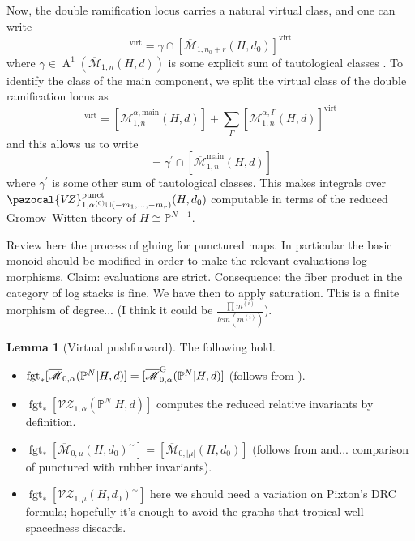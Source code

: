\documentclass[11pt]{amsart}
\newcommand{\M}[4]{\overline{\mathcal{M}}_{#1,#2}(#3,#4)}
\newcommand{\MG}[4]{\overline{\mathcal{M}}^{\rm G}_{#1,#2}(#3,#4)}
\newcommand{\PP}{\mathbb P}
\newcommand{\VZ}{\pazocal{V\!Z}}
\newcommand{\VZc}[4]{\mathcal{V\!Z}_{#1,#2}(#3,#4)}
\newcommand{\virt}[1]{[#1]^{\operatorname{virt}}}
\newcommand{\Achow}{\operatorname{A}}
\newcommand{\fgt}{\operatorname{fgt}}
\newcommand{\Mcal}{\mathcal{M}}
\newcommand{\ol}[1]{\overline{#1}}
\theoremstyle{definition}
\newtheorem{lemma}[thm]{Lemma}
\theoremstyle{definition}
\begin{document}
Now, the double ramification locus carries a natural virtual class, and one can write
\begin{equation*} \virt{\ol{\Mcal}_{1,n_0+r}^{\alpha^{(0)}\cup(-m_1,\ldots,-m_r)}(H,d_0)} = \gamma \cap \virt{\ol{\Mcal}_{1,n_0+r}(H,d_0)} \end{equation*}
where $\gamma \in \Achow^1(\M{1}{n}{H}{d})$ is some explicit sum of tautological classes \cite{DRCBundle}. To identify the class of the main component, we split the virtual class of the double ramification locus as
\begin{equation*} \virt{\ol\Mcal^{\alpha}_{1,n}(H,d)} = [\ol\Mcal^{\alpha,\text{main}}_{1,n}(H,d)] + \sum_{\Gamma} \virt{\ol\Mcal^{\alpha,\Gamma}_{1,n}(H,d)} \end{equation*}
and this allows us to write
\begin{equation*} [\ol\Mcal^{\alpha,\text{main}}_{1,n}(H,d)] = \gamma^\prime \cap [\ol\Mcal^{\text{main}}_{1,n}(H,d)]\end{equation*}
where $\gamma^\prime$ is some other sum of tautological classes. This makes integrals over $\VZ^{\operatorname{punct}}_{1,\alpha^{(0)}\cup(-m_1,\ldots,-m_r)}(H,d_0)$ computable in terms of the reduced Gromov--Witten theory of $H\cong\PP^{N-1}$.

\newpage



Review here the process of gluing for punctured maps. In particular the basic monoid should be modified in order to make the relevant evaluations log morphisms. Claim: evaluations are strict. Consequence: the fiber product in the category of log stacks is fine. We have then to apply saturation. This is a finite morphism of degree... (I think it could be $\frac{\prod m^{(i)}}{lcm(m^{(i)})}$).




\begin{lemma}[Virtual pushforward] The following hold.
 \begin{itemize}
  \item $\fgt_*[\M{0}{\alpha}{\PP^N|H}{d}]=[\MG{0}{\alpha}{\PP^N|H}{d}]$ (follows from \cite{GathmannThesis,AbramovichMarcusWiseComparison}).
  \item $\fgt_*[\VZc{1}{\alpha}{\PP^N|H}{d}]$ computes the reduced relative invariants by definition.
  \item $\fgt_*[\M{0}{\mu}{H}{d_0}^\sim]=[\M{0}{\lvert\mu\rvert}{H}{d_0}]$ (follows from \cite{GathmannThesis} and... comparison of punctured with rubber invariants).
  \item $\fgt_*[\VZc{1}{\mu}{H}{d_0}^\sim]$ here we should need a variation on Pixton's DRC formula; hopefully it's enough to avoid the graphs that tropical well-spacedness discards.
 \end{itemize}
\end{lemma}
\end{document}

